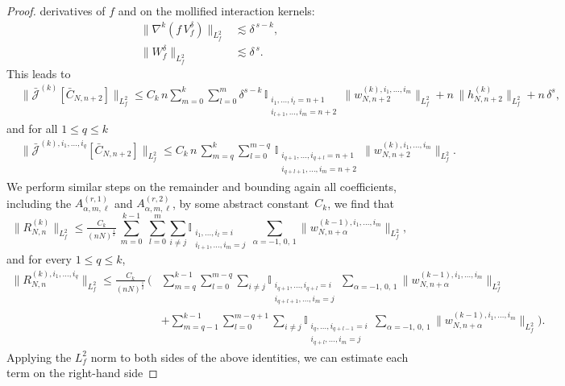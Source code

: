 \documentclass[pdflatex,sn-mathphys-num]{sn-jnl}
\theoremstyle{thmstyleone}%
\theoremstyle{thmstyletwo}%
\theoremstyle{thmstylethree}%
\begin{document}
\begin{proof}
derivatives of $f$ and on the mollified interaction kernels:
\begin{align*}
\big\|\nabla^{k}(f\,V_f^\delta)\big\|_{L^2_f} &\lesssim \delta^{\,s-k},\\[4pt]
\big\|W_f^\delta\big\|_{L^2_f} &\lesssim \delta^{\,s}.
\end{align*}
This leads to
\[
\begin{aligned}
&\|\bar{\mathcal J}^{(k)}[\bar C_{N,n+2}]\|_{L^2_f} \leq C_k\,  n \sum_{m=0}^{k} \sum_{l=0}^{m} \delta^{s-k}\,\mathbb{I}_{\substack{i_{1},\ldots, i_{l}=n+1 \\ i_{l+1},\ldots,i_m=n+2}}\, 
\|w_{N,n+2}^{(k),i_1,\dots,i_m}\|_{L^2_f}+ n \,
\|h_{N,n+2}^{(k)}\|_{L^2_f} + n\,\delta^s,
\end{aligned}
\]
and for all \(1 \leq q \leq k\) 
\[
\begin{aligned}
&\|\bar{\mathcal J}^{(k),i_1,\dots,i_q}[\bar C_{N,n+2}]\|_{L^2_f}
\leq C_k\,n\,\sum_{m=q}^k\sum_{l=0}^{m-q} \,\mathbb{I}_{\substack{i_{q+1},\ldots, i_{q+l}=n+1 \\ i_{q+l+1},\ldots,i_m=n+2}}\,
\|w_{N,n+2}^{(k),i_1,\dots,i_m}\|_{L^2_f}.
\end{aligned}
\]
%
We perform similar steps on the remainder and bounding again all coefficients, including the $A_{\alpha,m,\ell}^{(r,1)}$ and $A_{\alpha,m,\ell}^{(r,2)}$, by some abstract constant~$C_k$, we find that 
\[
{\|}R_{N,n}^{(k)}{\|_{L^2_f}}
\leq  \tfrac{C_k}{(nN)^{\frac12}}\,
\sum_{m=0}^{k-1} \;\sum_{l=0}^{m}\sum_{i\neq j} \mathbb{I}_{\substack{i_{1},\ldots, i_{l}=i \\ i_{l+1},\ldots,i_m=j}}\,\sum_{\alpha=-1,\,0,\,1}
\|w_{N,n+\alpha}^{(k-1),i_1,\dots,i_{m}}\|_{L^2_f},
\]
and for every \(1\le q\le k\),
\[
\begin{aligned}
\|R_{N,n}^{(k),i_1,\dots,i_q}\|_{L^2_f}
\leq \tfrac{C_k}{(nN)^{\frac12}}\,\Bigg(
&\sum_{m=q}^{k-1} \sum_{l=0}^{m-q}\sum_{i\neq j} \mathbb{I}_{\substack{i_{q+1},\ldots, i_{q+l}=i \\ i_{q+l+1},\ldots,i_m=j}}\,\sum_{\alpha=-1,\,0,\,1} 
\|w_{N,n+\alpha}^{(k-1),i_1,\dots,i_{m}}\|_{L^2_f}\\
&+\sum_{m=q-1}^{k-1} \sum_{l=0}^{m-q+1}\sum_{i\neq j}
\mathbb{I}_{\substack{
i_q,\ldots,i_{q+l-1}=i\\
i_{q+l},\ldots,i_m=j
}}\,\sum_{\alpha=-1,\,0,\,1} 
\|w_{N,n+\alpha}^{(k-1),i_1,\dots,i_{m}}\|_{L^2_f}
\Bigg).
\end{aligned}
\]
%
Applying the $L^2_f$ norm to both sides of the above identities, we can estimate each term on the right-hand side

\end{proof}
\end{document}
